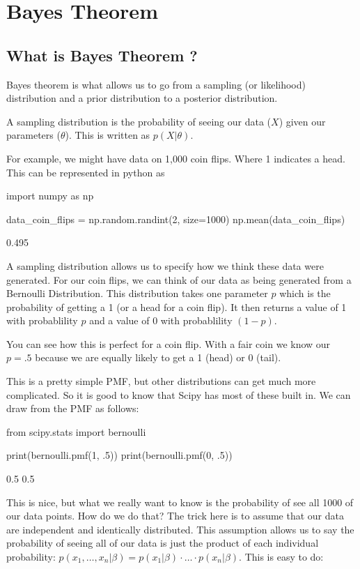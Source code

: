 \chapter{Bayes Theorem}
\label{ch:bayes_theorem}

\section{What is Bayes Theorem ?}
Bayes theorem is what allows us to go from a sampling (or likelihood) distribution and a prior distribution to a posterior distribution.

A sampling distribution is the probability of seeing our data ($X$) given our parameters ($\theta$). This is written as $p(X|θ)$.

For example, we might have data on 1,000 coin flips. Where 1 indicates a head. This can be represented in python as
\begin{ipython}
import numpy as np

data_coin_flips = np.random.randint(2, size=1000)
np.mean(data_coin_flips)
\end{ipython}
\begin{ioutput}
0.495
\end{ioutput}

A sampling distribution allows us to specify how we think these data were generated. For our coin flips, we can think of our data as being generated from a Bernoulli Distribution. This distribution takes one parameter $p$ which is the probability of getting a 1 (or a head for a coin flip). It then returns a value of 1 with probablility $p$ and a value of 0 with probablility $(1-p)$.

You can see how this is perfect for a coin flip. With a fair coin we know our $p = .5$ because we are equally likely to get a 1 (head) or 0 (tail). 

This is a pretty simple PMF, but other distributions can get much more complicated. So it is good to know that Scipy has most of these built in. We can draw from the PMF as follows:

\begin{ipython}
from scipy.stats import bernoulli

print(bernoulli.pmf(1, .5))
print(bernoulli.pmf(0, .5))
\end{ipython}
\begin{ioutput}
0.5
0.5
\end{ioutput}

This is nice, but what we really want to know is the probability of see all 1000 of our data points. How do we do that? The trick here is to assume that our data are independent and identically distributed. This assumption allows us to say the probability of seeing all of our data is just the product of each individual probability: $p(x_1,\ldots,x_n|\beta)=p(x_1|\beta)\cdot\ldots\cdot p(x_n|\beta).$ This is easy to do:

